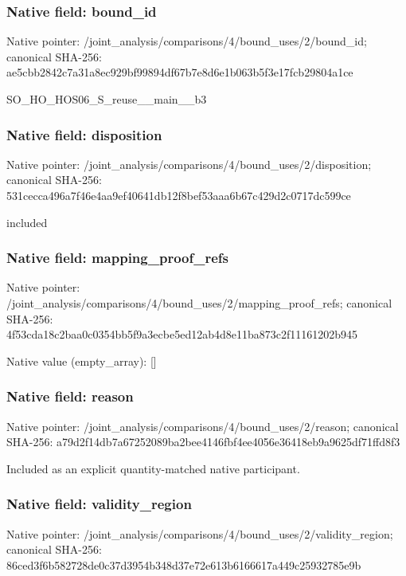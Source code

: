 \documentclass[10pt,a4paper]{article}
\begin{document}
\subsubsection{Native field: bound\_\allowbreak{}id}
Native pointer: /joint\_\allowbreak{}analysis/comparisons/4/bound\_\allowbreak{}uses/2/bound\_\allowbreak{}id; canonical SHA-256: ae5cbb2842c7a31a8ec929bf99894df67b7e8d6e1b063b5f3e17fcb29804a1ce

\begingroup\raggedright\sloppy SO\_\allowbreak{}HO\_\allowbreak{}HOS06\_\allowbreak{}S\_\allowbreak{}reuse\_\allowbreak{}\_\allowbreak{}main\_\allowbreak{}\_\allowbreak{}b3\par\endgroup

\subsubsection{Native field: disposition}
Native pointer: /joint\_\allowbreak{}analysis/comparisons/4/bound\_\allowbreak{}uses/2/disposition; canonical SHA-256: 531cecca496a7f46e4aa9ef40641db12f8bef53aaa6b67c429d2c0717dc599ce

\begingroup\raggedright\sloppy included\par\endgroup

\subsubsection{Native field: mapping\_\allowbreak{}proof\_\allowbreak{}refs}
Native pointer: /joint\_\allowbreak{}analysis/comparisons/4/bound\_\allowbreak{}uses/2/mapping\_\allowbreak{}proof\_\allowbreak{}refs; canonical SHA-256: 4f53cda18c2baa0c0354bb5f9a3ecbe5ed12ab4d8e11ba873c2f11161202b945

Native value (empty\_\allowbreak{}array): []

\subsubsection{Native field: reason}
Native pointer: /joint\_\allowbreak{}analysis/comparisons/4/bound\_\allowbreak{}uses/2/reason; canonical SHA-256: a79d2f14db7a67252089ba2bee4146fbf4ee4056e36418eb9a9625df71ffd8f3

\begingroup\raggedright\sloppy Included as an explicit quantity-matched native participant.\par\endgroup

\subsubsection{Native field: validity\_\allowbreak{}region}
Native pointer: /joint\_\allowbreak{}analysis/comparisons/4/bound\_\allowbreak{}uses/2/validity\_\allowbreak{}region; canonical SHA-256: 86ced3f6b582728de0c37d3954b348d37e72e613b6166617a449c25932785e9b
\end{document}
